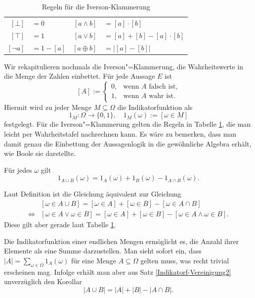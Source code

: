 \begin{table}
\centering
\caption{Regeln für die Iverson-Klammerung}
\label{tab:Iverson}
\begin{tabular}{r@{\;}l@{\qquad}r@{\;}l}
\toprule
$[\bot]$ & $= 0$ & $[a\land b]$ & $= [a]\cdot [b]$\\
$[\top]$ & $= 1$ & $[a\lor b]$ & $= [a] + [b] - [a]\cdot [b]$\\
$[\lnot a]$ & $= 1 - [a]$ & $[a\oplus b]$ & $= |[a] - [b]|$\\
\bottomrule
\end{tabular}
\end{table}

Wir rekapitulieren nochmals die Iverson"=Klammerung, die Wahrheitswerte
in die Menge der Zahlen einbettet. Für jede Aussage $E$ ist
\[[A] := \begin{cases}
0, & \text{wenn $A$ falsch ist,}\\
1, & \text{wenn $A$ wahr ist.}
\end{cases}\]
Hiermit wird zu jeder Menge $M\subseteq\Omega$ die Indikatorfunktion als
\[1_M\colon\Omega\to\{0,1\},\quad 1_M(\omega) := [\omega\in M]\]
festgelegt. Für die Iverson"=Klammerung gelten die Regeln in Tabelle
\ref{tab:Iverson}, die man leicht per Wahrheitstafel nachrechnen kann.
Es wäre zu bemerken, dass man damit genau die Einbettung der
Aussagenlogik in die gewöhnliche Algebra erhält, wie Boole sie
darstellte.
\begin{Satz}\label{Indikatorf-Vereinigung2}
Für jedes $\omega$ gilt
\[1_{A\cup B}(\omega) = 1_A(\omega) + 1_B(\omega) - 1_{A\cap B}(\omega).\]
\end{Satz}
\begin{Beweis}
Laut Definition ist die Gleichung äquivalent zur Gleichung
\begin{align*}
&[\omega\in A\cup B] = [\omega\in A] + [\omega\in B] - [\omega\in A\cap B]\\
\iff & [\omega\in A\lor\omega\in B] = [\omega\in A] + [\omega\in B] - [\omega\in A\land\omega\in B].
\end{align*}
Diese gilt aber gerade laut Tabelle \ref{tab:Iverson}.\,\qedsymbol
\end{Beweis}

\noindent
Die Indikatorfunktion einer endlichen Mengen ermöglicht es, die
Anzahl ihrer Elemente als eine Summe darzustellen. Man sieht sofort ein,
dass $|A| = \sum_{\omega\in\Omega} 1_A(\omega)$ für eine Menge $A\subseteq\Omega$
gelten muss, was recht trivial erscheinen mag. Infolge erhält man aber aus
Satz \ref{Indikatorf-Vereinigung2} unverzüglich den Korollar
\[|A\cup B| = |A|+|B|-|A\cap B|.\]

